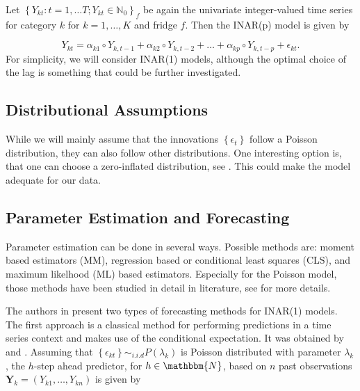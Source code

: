 Let $\left\{Y_{kt}:t=1,\ldots T; Y_{kt} \in \mathbb{N}_0\right\}_f$ be again the univariate integer-valued time series for category $k$ for $k=1,\ldots,K$ and fridge $f$. Then the INAR(p) model is given by

\begin{equation}
Y_{kt} = \alpha_{k1} \circ Y_{k,t-1} + \alpha_{k2} \circ Y_{k,t-2} + \ldots + \alpha_{kp} \circ Y_{k,t-p} +\epsilon_{kt}.
\label{eq:Inar(p) model ts}
\end{equation}
%
For simplicity, we will consider INAR(1) models, although the optimal choice of the lag is something that could be further investigated. 

\subsection{Distributional Assumptions}
\label{sec: Inar Distributional assumptions}

While we will mainly assume that the innovations $\left\{\epsilon_t\right\}$ follow a Poisson distribution, they can also follow other distributions. One interesting option is, that one can choose a zero-inflated distribution, see \textcite{Garay:2022}. This could make the model adequate for our data. 


\subsection{Parameter Estimation and Forecasting}
\label{sec: Inar Parameter Estimation and Forecasting}

Parameter estimation can be done in several ways. Possible methods are: moment based estimators (MM), regression based or conditional least squares (CLS), and maximum likelhood (ML) based estimators. Especially for the Poisson model, those methods have been studied in detail in literature, see \textcite{Silva:2005} for more details. 

The authors in \textcite{Silva:2005} present two types of forecasting methods for INAR(1) models. The first approach is a classical method for performing predictions in a time series context and makes use of the conditional expectation. It was obtained by \textcite{Bre:1993} and \textcite{Freeland:2004}. Assuming that $\left\{\epsilon_{kt}\right\} \sim_{i.i.d} P(\lambda_k)$ is Poisson distributed with parameter $\lambda_k$, the $h$-step ahead predictor, for $h\in \mathbbm{N}$, based on $n$ past observations $\bm{Y}_k=(Y_{k1},\ldots,Y_{kn})$ is given by

